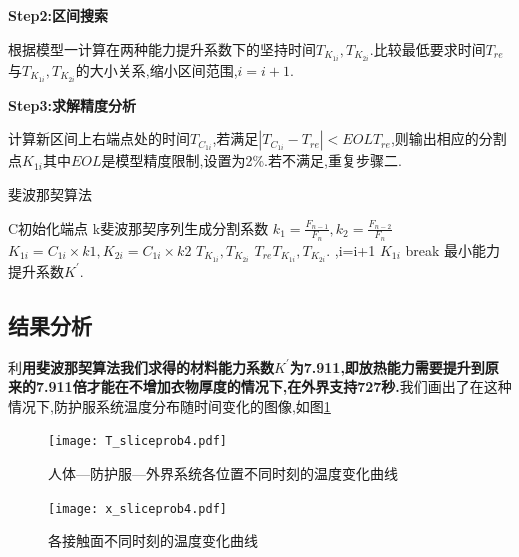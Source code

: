 \documentclass{whutmod}
\begin{document}
\textbf{Step2:区间搜索}

根据模型一计算在两种能力提升系数下的坚持时间$T_{K_{1i}},T_{K_{2i}}$.比较最低要求时间$T_{re}$与$T_{K_{1i}},T_{K_{2i}}$的大小关系,缩小区间范围,$i=i+1$.

\textbf{Step3:求解精度分析}

计算新区间上右端点处的时间$T_{C_{1i}}$,若满足$|T_{C_{1i}}-T_{re}|<EOL T_{re}$,则输出相应的分割点$K_{1i}$其中$EOL$是模型精度限制,设置为2\%.若不满足,重复步骤二.
\begin{algorithm}
	\caption{斐波那契算法}
	\begin{algorithmic}
		\Require C初始化端点
		\Require k斐波那契序列生成分割系数
		\State $k_{1}=\frac{F_{n-1}}{F_{n}},k_{2}=\frac{F_{n-2}}{F_{n}}$
		\State $K_{1i}=C_{1i}\times k1,K_{2i}=C_{1i}\times k2$
		\State {}$T_{K_{1i}},T_{K_{2i}}$
		\State {}$T_{re}$$T_{K_{1i}},T_{K_{2i}}$.
		\State {},i=i+1
		\State {}
		\State {}$K_{1i}$
		\State  break
		\EndIf
		\EndFor
		\Ensure 最小能力提升系数$K^{\prime}$.
	\end{algorithmic} 
\end{algorithm}

\subsection{结果分析}
利\textbf{用斐波那契算法我们求得的材料能力系数$K^{\prime}$为\textbf{7.911},即放热能力需要提升到原来的7.911倍才能在不增加衣物厚度的情况下,在外界支持727秒.}我们画出了在这种情况下,防护服系统温度分布随时间变化的图像,如图\ref{fig:T_sliceprob4}
\begin{figure}[!h]
	\begin{minipage}[t]{0.48\textwidth}
		\centering
		\texttt{[image: T\_sliceprob4.pdf]}
		\caption{人体—防护服—外界系统各位置不同时刻的温度变化曲线}
		\label{fig:T_sliceprob4}
	\end{minipage}
	\begin{minipage}[t]{0.48\textwidth}
		\centering
		\texttt{[image: x\_sliceprob4.pdf]}
		\caption{各接触面不同时刻的温度变化曲线}
	\end{minipage}
\end{figure}
\end{document}
